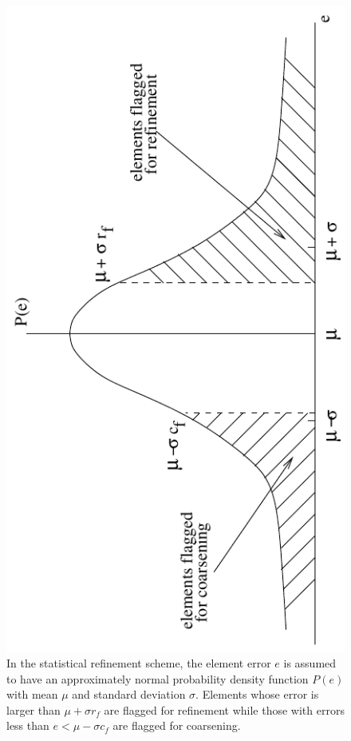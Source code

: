 \documentclass[global,twocolumn,final]{svjour}
\begin{document}
\begin{figure}[hbt]
  \begin{center}
    \includegraphics[angle=-90,width=\columnwidth]{figures/ref_scheme}
    \caption{In the statistical refinement scheme,
      the element error $e$ is assumed to have an approximately normal probability
      density function $P(e)$ with mean $\mu$ and standard deviation $\sigma$.
      Elements whose error is larger than $\mu + \sigma r_f$ are flagged for
      refinement while those with errors less than $e < \mu - \sigma c_f$ are flagged
      for coarsening.\label{fig:ref_scheme}}
  \end{center}
\end{figure}
\end{document}
